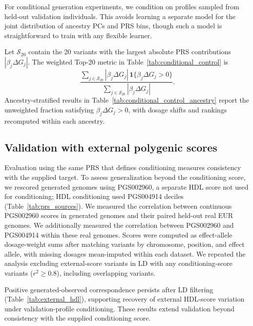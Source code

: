 \documentclass{article}
\begin{document}
For conditional generation experiments, we condition on profiles sampled from held-out validation individuals. This avoids learning a separate model for the joint distribution of ancestry PCs and PRS bins, though such a model is straightforward to train with any flexible learner.

Let \(\mathcal S_{20}\) contain the 20 variants with the largest absolute PRS contributions \(|\beta_j\Delta G_j|\). The weighted Top-20 metric in Table~\ref{tab:conditional_control} is
\[
\frac{\sum_{j\in\mathcal S_{20}}|\beta_j\Delta G_j|\,
\mathbf 1\{\beta_j\Delta G_j>0\}}
{\sum_{j\in\mathcal S_{20}}|\beta_j\Delta G_j|}.
\]
Ancestry-stratified results in Table~\ref{tab:conditional_control_ancestry} report the unweighted fraction satisfying \(\beta_j\Delta G_j>0\), with dosage shifts and rankings recomputed within each ancestry.

\subsection{Validation with external polygenic scores}
\label{app:external_hdl}

Evaluation using the same PRS that defines conditioning measures consistency with the supplied target. To assess generalization beyond the conditioning score, we rescored generated genomes using PGS002960, a separate HDL score not used for conditioning; HDL conditioning used PGS004914 deciles (Table~\ref{tab:prs_sources}). We measured the correlation between continuous PGS002960 scores in generated genomes and their paired held-out real EUR genomes. We additionally measured the correlation between PGS002960 and PGS004914 within these real genomes. Scores were computed as effect-allele dosage-weight sums after matching variants by chromosome, position, and effect allele, with missing dosages mean-imputed within each dataset. We repeated the analysis excluding external-score variants in LD with any conditioning-score variants (\(r^2\geq0.8\)), including overlapping variants. 

Positive generated-observed correspondence persists after LD filtering (Table~\ref{tab:external_hdl}), supporting recovery of external HDL-score variation under validation-profile conditioning. These results extend validation beyond consistency with the supplied conditioning score.
\end{document}
